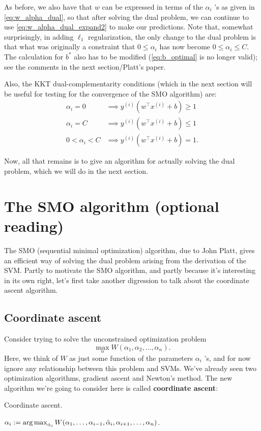 As before, we also have that $w$ can be expressed in terms of the $\alpha_i$ 's
as given in \cref{eq:w_alpha_dual}, so that after solving the dual problem, we can
continue to use \cref{eq:w_alpha_dual_expand2} to make our predictions. Note that, somewhat
surprisingly, in adding $\ell_1$ regularization, the only change to the dual problem
is that what was originally a constraint that $0 \le \alpha_i$ has now become $0 \le
\alpha_i \le C$. The calculation for $b^*$ also has to be modified (\cref{eq:b_optimal} is no
longer valid); see the comments in the next section/Platt's paper. %

Also, the KKT dual-complementarity conditions (which in the next section
will be useful for testing for the convergence of the SMO algorithm) are:
\begin{align}
    \alpha_i = 0 &\implies y^{(i)} (w^\top x^{(i)} + b) \ge 1\label{eq:kkt_dual1}\\
    \alpha_i = C &\implies y^{(i)} (w^\top x^{(i)} + b) \le 1\label{eq:kkt_dual2}\\
    0 < \alpha_i < C &\implies y^{(i)} (w^\top x^{(i)} + b) = 1\label{eq:kkt_dual3}.    
\end{align}

Now, all that remains is to give an algorithm for actually solving the dual
problem, which we will do in the next section.

\section{The SMO algorithm (optional reading)}
The SMO (sequential minimal optimization) algorithm, due to John Platt, %
gives an efficient way of solving the dual problem arising from the derivation
of the SVM. Partly to motivate the SMO algorithm, and partly because it's
interesting in its own right, let's first take another digression to talk about
the coordinate ascent algorithm.

\subsection{Coordinate ascent}
Consider trying to solve the unconstrained optimization problem
\begin{equation*}
\max_\alpha W(\alpha_1 ,\alpha_2 ,\ldots ,\alpha_n ).
\end{equation*}
Here, we think of $W$ as just some function of the parameters $\alpha_i$ 's, and for now
ignore any relationship between this problem and SVMs. We've already seen
two optimization algorithms, gradient ascent and Newton's method. The
new algorithm we're going to consider here is called \textbf{coordinate ascent}:
\begin{algorithm}[ht]
    \caption{Coordinate ascent.}
    \label{alg:coordinate_ascent}
    \begin{algorithmic}
    \Repeat
            \State $\alpha_i := \argmax_{\hat{\alpha}_i} W(\alpha_1 ,\ldots ,\alpha_{i-1}, \hat{\alpha}_i ,\alpha_{i+1},\ldots ,\alpha_n)$.
        \EndFor
    \end{algorithmic}
\end{algorithm}

